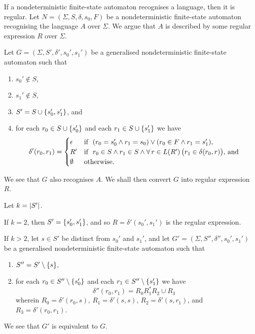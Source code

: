 \Blm
    \label{lem2}
    If a nondeterministic finite-state automaton recognises a language, then it
    is regular.
\Elm
\Bpr
    Let \(N = (\Sigma, S, \delta, s_0, F)\) be a nondeterministic finite-state
    automaton recognising the language \(A\) over \(\Sigma\). We argue that
    \(A\) is described by some regular expression \(R\) over \(\Sigma\).

    Let \(G = (\Sigma, S', \delta', s_0', s_1')\) be a generalised
    nondeterministic finite-state automaton such that
    \begin{enumerate}
        \item \(s_0' \not\in S\),
        \item \(s_1' \not\in S\),
        \item \(S' = S \cup \{s_0', s_1'\}\), and
        \item for each \(r_0 \in S \cup \{s_0'\}\) and each \(r_1 \in S \cup
        \{s_1'\}\) we have
            \[
                \delta'(r_0, r_1) = \begin{cases}
                        \epsilon & \text{if }\ (r_0 = s_0' \land r_1 = s_0) \lor
                        (r_0 \in F \land r_1 = s_1'),\\
                        R' & \text{if }\ r_0 \in S \land r_1 \in S \land \forall
                        \, r \in L(R') \, \big(r_1 \in \delta(r_0, r)\big)
                        \text{, and}\\
                        \emptyset & \text{otherwise.}
                    \end{cases}
            \]
    \end{enumerate}
    We see that \(G\) also recognises \(A\). We shall then convert \(G\) into
    regular expression \(R\).

    Let \(k = \lvert S'\rvert\).

    If \(k = 2\), then \(S' = \{s_0', s_1'\}\), and so \(R = \delta'(s_0',
    s_1')\) is the regular expression.

    If \(k > 2\), let \(s \in S'\) be distinct from \(s_0'\) and \(s_1'\), and
    let \(G' = (\Sigma, S'', \delta'', s_0', s_1')\) be a generalised
    nondeterministic finite-state automaton such that
    \begin{enumerate}
        \item \(S'' = S' \setminus \{s\}\),
        \item for each \(r_0 \in S'' \setminus \{s_0'\}\) and each \(r_1 \in
        S'' \setminus \{s_1'\}\) we have
        \[
            \delta''(r_0, r_1) = R_0 R_1^* R_2 \cup R_3
        \]
        wherein \(R_0 = \delta'(r_0, s)\), \(R_1 = \delta'(s, s)\), \(R_2 =
        \delta'(s, r_1)\), and \(R_3 = \delta'(r_0, r_1)\).
    \end{enumerate}
    We see that \(G'\) is equivalent to \(G\).

